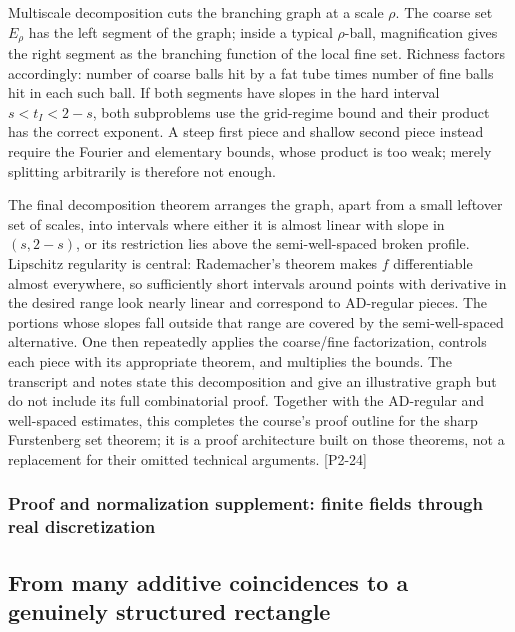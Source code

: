 Multiscale decomposition cuts the branching graph at a scale \(\rho\). The coarse set \(E_\rho\) has the left segment of the graph; inside a typical \(\rho\)-ball, magnification gives the right segment as the branching function of the local fine set. Richness factors accordingly: number of coarse balls hit by a fat tube times number of fine balls hit in each such ball. If both segments have slopes in the hard interval \(s<t_I<2-s\), both subproblems use the grid-regime bound and their product has the correct exponent. A steep first piece and shallow second piece instead require the Fourier and elementary bounds, whose product is too weak; merely splitting arbitrarily is therefore not enough.

The final decomposition theorem arranges the graph, apart from a small leftover set of scales, into intervals where either it is almost linear with slope in \((s,2-s)\), or its restriction lies above the semi-well-spaced broken profile. Lipschitz regularity is central: Rademacher's theorem makes \(f\) differentiable almost everywhere, so sufficiently short intervals around points with derivative in the desired range look nearly linear and correspond to AD-regular pieces. The portions whose slopes fall outside that range are covered by the semi-well-spaced alternative. One then repeatedly applies the coarse/fine factorization, controls each piece with its appropriate theorem, and multiplies the bounds. The transcript and notes state this decomposition and give an illustrative graph but do not include its full combinatorial proof. Together with the AD-regular and well-spaced estimates, this completes the course's proof outline for the sharp Furstenberg set theorem; it is a proof architecture built on those theorems, not a replacement for their omitted technical arguments. {[}P2-24{]}

\subsubsection{Proof and normalization supplement: finite fields through real discretization}\label{04-visual-computing-ii-ch033-proof-and-normalization-supplement-finite-fields-through-real-discretization}

\hypertarget{04-visual-computing-ii-ch033-proof-and-normalization-supplement-finite-fields-through-real-discretization}{}

\subsection{From many additive coincidences to a genuinely structured rectangle}\label{04-visual-computing-ii-ch033-from-many-additive-coincidences-to-a-genuinely-structured-rectangle-1}

